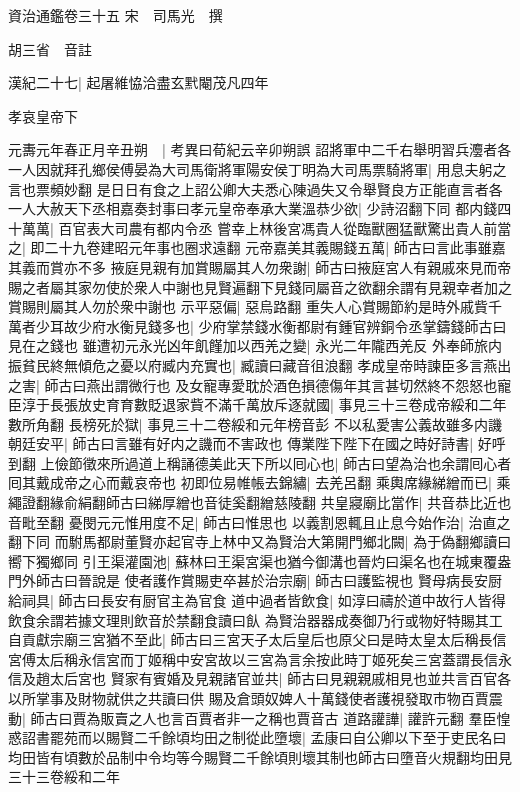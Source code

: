 資治通鑑卷三十五
宋　司馬光　撰

胡三省　音註

漢紀二十七|{
	起屠維恊洽盡玄黓閹茂凡四年}


孝哀皇帝下

元夀元年春正月辛丑朔　|{
	考異曰荀紀云辛卯朔誤}
詔將軍中二千右舉明習兵灋者各一人因就拜孔鄉侯傅晏為大司馬衛將軍陽安侯丁明為大司馬票騎將軍|{
	用息夫躬之言也票頻妙翻}
是日日有食之上詔公卿大夫悉心陳過失又令舉賢良方正能直言者各一人大赦天下丞相嘉奏封事曰孝元皇帝奉承大業溫恭少欲|{
	少詩沼翻下同}
都内錢四十萬萬|{
	百官表大司農有都内令丞}
嘗幸上林後宮馮貴人從臨獸圈猛獸驚出貴人前當之|{
	即二十九卷建昭元年事也圈求遠翻}
元帝嘉美其義賜錢五萬|{
	師古曰言此事雖嘉其義而賞亦不多}
掖庭見親有加賞賜屬其人勿衆謝|{
	師古曰掖庭宮人有親戚來見而帝賜之者屬其家勿使於衆人中謝也見賢遍翻下見錢同屬音之欲翻余謂有見親幸者加之賞賜則屬其人勿於衆中謝也}
示平惡偏|{
	惡烏路翻}
重失人心賞賜節約是時外戚貲千萬者少耳故少府水衡見錢多也|{
	少府掌禁錢水衡都尉有鍾官辨銅令丞掌鑄錢師古曰見在之錢也}
雖遭初元永光凶年飢饉加以西羌之變|{
	永光二年隴西羌反}
外奉師旅内振貧民終無傾危之憂以府臧内充實也|{
	臧讀曰藏音徂浪翻}
孝成皇帝時諫臣多言燕出之害|{
	師古曰燕出謂微行也}
及女寵專愛耽於酒色損德傷年其言甚切然終不怨怒也寵臣淳于長張放史育育數貶退家貲不滿千萬放斥逐就國|{
	事見三十三卷成帝綏和二年數所角翻}
長榜死於獄|{
	事見三十二卷綏和元年榜音彭}
不以私愛害公義故雖多内譏朝廷安平|{
	師古曰言雖有好内之譏而不害政也}
傳業陛下陛下在國之時好詩書|{
	好呼到翻}
上儉節徵來所過道上稱誦德美此天下所以囘心也|{
	師古曰望為治也余謂囘心者囘其戴成帝之心而戴哀帝也}
初即位易帷帳去錦繡|{
	去羌呂翻}
乘輿席緣綈繒而已|{
	乘繩證翻緣俞絹翻師古曰綈厚繒也音徒奚翻繒慈陵翻}
共皇寢廟比當作|{
	共音恭比近也音毗至翻}
憂閔元元惟用度不足|{
	師古曰惟思也}
以義割恩輒且止息今始作治|{
	治直之翻下同}
而駙馬都尉董賢亦起官寺上林中又為賢治大第開門鄉北闕|{
	為于偽翻鄉讀曰嚮下獨鄉同}
引王渠灌園池|{
	蘇林曰王渠宮渠也猶今御溝也晉灼曰渠名也在城東覆盎門外師古曰晉說是}
使者護作賞賜吏卒甚於治宗廟|{
	師古曰護監視也}
賢母病長安厨給祠具|{
	師古曰長安有厨官主為官食}
道中過者皆飲食|{
	如淳曰禱於道中故行人皆得飲食余謂若據文理則飲音於禁翻食讀曰飤}
為賢治器器成奏御乃行或物好特賜其工自貢獻宗廟三宮猶不至此|{
	師古曰三宮天子太后皇后也原父曰是時太皇太后稱長信宮傅太后稱永信宮而丁姬稱中安宮故以三宮為言余按此時丁姬死矣三宮蓋謂長信永信及趙太后宮也}
賢家有賓婚及見親諸官並共|{
	師古曰見親親戚相見也並共言百官各以所掌事及財物就供之共讀曰供}
賜及倉頭奴婢人十萬錢使者護視發取市物百賈震動|{
	師古曰賈為販賣之人也言百賈者非一之稱也賈音古}
道路讙譁|{
	讙許元翻}
羣臣惶惑詔書罷苑而以賜賢二千餘頃均田之制從此墮壞|{
	孟康曰自公卿以下至于吏民名曰均田皆有頃數於品制中令均等今賜賢二千餘頃則壞其制也師古曰墮音火規翻均田見三十三卷綏和二年}

